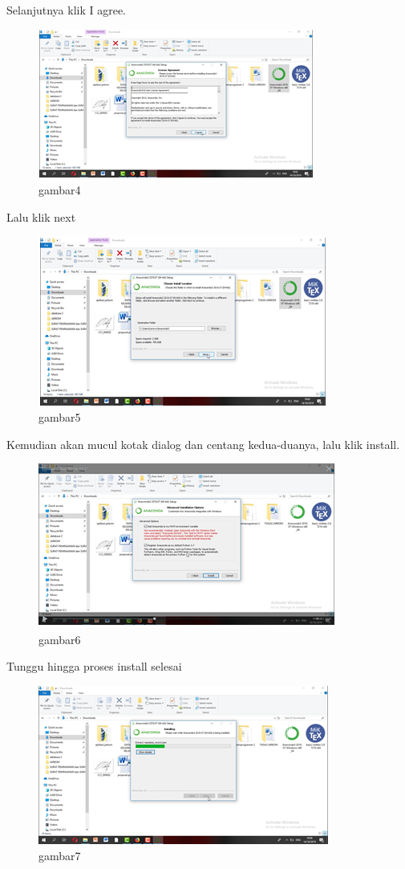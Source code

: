Selanjutnya klik I agree.
\begin{figure}[h]
\centering
\includegraphics[scale=0.9]{gambar/4.png}
\caption{gambar4}
\label{fig:my_label}
\end{figure}

Lalu klik next
\begin{figure}[h]
\centering
\includegraphics[scale=0.9]{section/5.png}
\caption{gambar5}
\label{fig:my_label}
\end{figure}

Kemudian akan mucul kotak dialog dan centang kedua-duanya, lalu klik install.
\begin{figure}[h]
\centering
\includegraphics[scale=0.9]{section/6.png}
\caption{gambar6}
\label{fig:my_label}
\end{figure}

Tunggu hingga proses install selesai
\begin{figure}[h]
\centering
\includegraphics[scale=0.9]{section/7.png}
\caption{gambar7}
\label{fig:my_label}
\end{figure}

